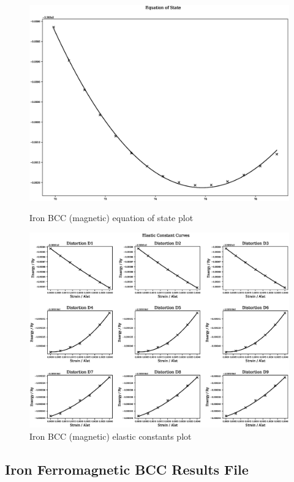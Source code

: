\FloatBarrier
\begin{figure}[!htb]
\includegraphics[width=\linewidth]{appendix/dft_property_calculations/bccfe/eos.eps}
\caption{Iron BCC (magnetic) equation of state plot}
\label{fig:feeosplot2}
\endminipage\hfill
{}
\includegraphics[width=\linewidth]{appendix/dft_property_calculations/bccfe/ec.eps}
\caption{Iron BCC (magnetic) elastic constants plot}
\label{fig:feecplot2}
\endminipage
\end{figure}
\FloatBarrier


\clearpage
\FloatBarrier
\subsection{Iron Ferromagnetic BCC Results File}


